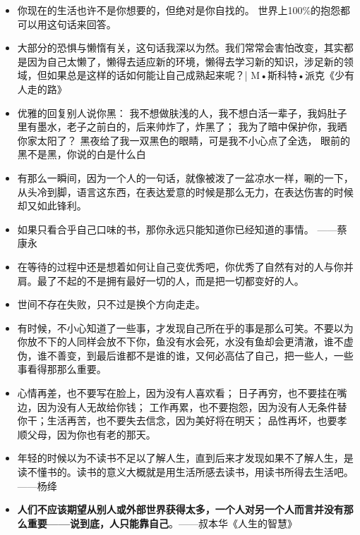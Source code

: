 \documentclass[UTF8,a4paper,8pt]{ctexart}
\begin{document}
\begin{itemize}
 	\item 你现在的生活也许不是你想要的，但绝对是你自找的。 世界上100\%的抱怨都可以用这句话来回答。
 	
 	\item 大部分的恐惧与懒惰有关，这句话我深以为然。我们常常会害怕改变，其实都是因为自己太懒了，懒得去适应新的环境，懒得去学习新的知识，涉足新的领域，但如果总是这样的话如何能让自己成熟起来呢？| M•斯科特•派克《少有人走的路》
 	
 	\item  优雅的回复别人说你黑： 我不想做肤浅的人，我不想白活一辈子，我妈肚子里有墨水，老子之前白的，后来帅炸了，炸黑了； 我为了暗中保护你，我晒你家太阳了？ 黑夜给了我一双黑色的眼睛，可是我不小心点了全选， 眼前的黑不是黑，你说的白是什么白
 	
 	\item 有那么一瞬间，因为一个人的一句话，就像被泼了一盆凉水一样，唰的一下，从头冷到脚，语言这东西，在表达爱意的时候是那么无力，在表达伤害的时候却又如此锋利。
 	
 	\item 如果只看合乎自己口味的书，那你永远只能知道你已经知道的事情。 ——蔡康永
 	
 	\item 在等待的过程中还是想着如何让自己变优秀吧，你优秀了自然有对的人与你并肩。最了不起的不是拥有最好一切的人，而是把一切都变好的人。
 	
 	\item 世间不存在失败，只不过是换个方向走走。
 	
 	\item 有时候，不小心知道了一些事，才发现自己所在乎的事是那么可笑。不要以为你放不下的人同样会放不下你，鱼没有水会死，水没有鱼却会更清澈，谁不虚伪，谁不善变，到最后谁都不是谁的谁，又何必高估了自己，把一些人，一些事看得那那么重要。
 	
 	\item 心情再差，也不要写在脸上，因为没有人喜欢看； 日子再穷，也不要挂在嘴边，因为没有人无故给你钱； 工作再累，也不要抱怨，因为没有人无条件替你干；生活再苦，也不要失去信念，因为美好将在明天； 品性再坏，也要孝顺父母，因为你也有老的那天。
 	
 	\item 年轻的时候以为不读书不足以了解人生，直到后来才发现如果不了解人生，是读不懂书的。读书的意义大概就是用生活所感去读书，用读书所得去生活吧。——杨绛
 	
 	\item \textbf{人们不应该期望从别人或外部世界获得太多，一个人对另一个人而言并没有那么重要——说到底，人只能靠自己}。——叔本华《人生的智慧》
 	

\end{itemize}
\end{document}
